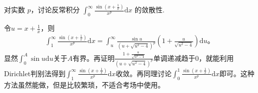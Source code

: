 \documentclass[../../main.tex]{subfiles}
\begin{document}
\begin{example}
对实数 \(p\)，讨论反常积分 \(\int_0^{\infty}{\frac{\sin \left( x+\frac{1}{x} \right)}{x^p}\mathrm{d}x}\) 的敛散性.
\end{example}
\begin{remark}
令\(u=x+\frac{1}{x}\)，则
\begin{align*}
\int_1^{\infty}{\frac{\sin \left( x+\frac{1}{x} \right)}{x^p}\mathrm{d}x}=\int_u^{\infty}{\frac{\sin u}{\left( u+\sqrt{u^2-4} \right) ^p}\left( 1+\frac{u}{\sqrt{u^2-4}} \right) \mathrm{d}u}。
\end{align*}
显然\(\int_0^A{\sin u\mathrm{d}u}\)关于\(A\)有界。再证明\(\frac{1+\frac{u}{\sqrt{u^2-4}}}{\left( u+\sqrt{u^2-4} \right) ^p}\)单调递减趋于0，就能利用Dirichlet判别法得到\(\int_1^{\infty}{\frac{\sin \left( x+\frac{1}{x} \right)}{x^p}\mathrm{d}x}\)收敛。再同理讨论\(\int_0^1{\frac{\sin \left( x+\frac{1}{x} \right)}{x^p}\mathrm{d}x}\)即可。这种方法虽然能做，但是比较繁琐，不适合考场中使用。
\end{remark}
\end{document}
